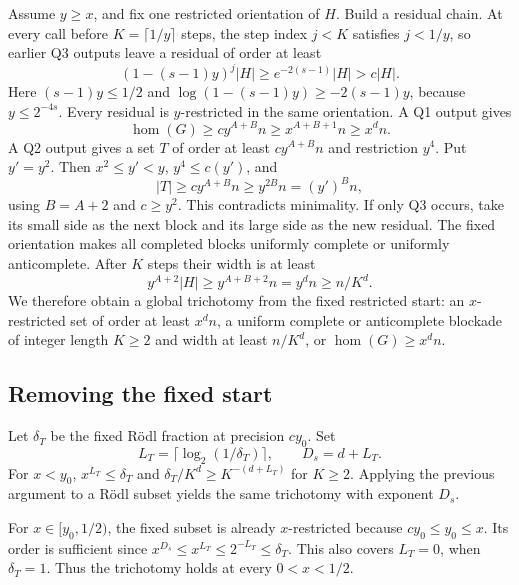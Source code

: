 \documentclass[11pt,a4paper]{article}
\theoremstyle{definition}
\theoremstyle{remark}
\numberwithin{equation}{section}
\begin{document}
Assume \(y\ge x\), and fix one restricted orientation of \(H\). Build a residual chain. At every call before \(K=\lceil1/y\rceil\) steps, the step index \(j<K\) satisfies \(j<1/y\), so earlier Q3 outputs leave a residual of order at least
\[
 (1-(s-1)y)^j|H|\ge e^{-2(s-1)}|H|>c|H|.
\]
Here \((s-1)y\le1/2\) and \(\log(1-(s-1)y)\ge-2(s-1)y\), because \(y\le2^{-4s}\). Every residual is \(y\)-restricted in the same orientation. A Q1 output gives
\[
 \hom(G)\ge cy^{A+B}n\ge x^{A+B+1}n\ge x^d n.
\]
A Q2 output gives a set \(T\) of order at least \(cy^{A+B}n\) and restriction \(y^4\). Put \(y'=y^2\). Then \(x^2\le y'<y\), \(y^4\le c(y')\), and
\[
 |T|\ge cy^{A+B}n\ge y^{2B}n=(y')^B n,
\]
using \(B=A+2\) and \(c\ge y^2\). This contradicts minimality. If only Q3 occurs, take its small side as the next block and its large side as the new residual. The fixed orientation makes all completed blocks uniformly complete or uniformly anticomplete. After \(K\) steps their width is at least
\[
 y^{A+2}|H|\ge y^{A+B+2}n=y^d n\ge n/K^d.
\]
We therefore obtain a global trichotomy from the fixed restricted start: an \(x\)-restricted set of order at least \(x^d n\), a uniform complete or anticomplete blockade of integer length \(K\ge2\) and width at least \(n/K^d\), or \(\hom(G)\ge x^d n\).

\subsection{Removing the fixed start}
Let \(\delta_T\) be the fixed R\"odl fraction at precision \(cy_0\). Set
\begin{equation}\label{eq:term-D}
 L_T=\lceil\log_2(1/\delta_T)\rceil,\qquad D_s=d+L_T.
\end{equation}
For \(x<y_0\), \(x^{L_T}\le\delta_T\) and \(\delta_T/K^d\ge K^{-(d+L_T)}\) for \(K\ge2\). Applying the previous argument to a R\"odl subset yields the same trichotomy with exponent \(D_s\).

For \(x\in[y_0,1/2)\), the fixed subset is already \(x\)-restricted because \(cy_0\le y_0\le x\). Its order is sufficient since \(x^{D_s}\le x^{L_T}\le2^{-L_T}\le\delta_T\). This also covers \(L_T=0\), when \(\delta_T=1\). Thus the trichotomy holds at every \(0<x<1/2\).
\end{document}
